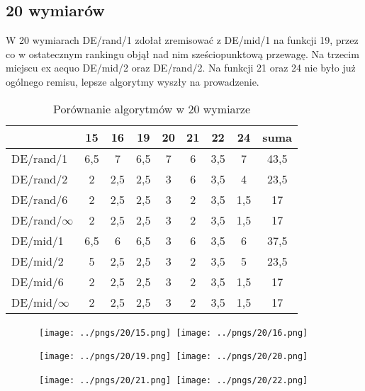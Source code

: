 \subsection{20 wymiarów}

W 20 wymiarach DE/rand/1 zdołał zremisować z DE/mid/1 na funkcji 19,
przez co w ostatecznym rankingu objął nad nim sześciopunktową przewagę.
Na trzecim miejscu ex aequo DE/mid/2 oraz DE/rand/2. Na funkcji 21 oraz 24 
nie było już ogólnego remisu, lepsze algorytmy wyszły na prowadzenie.

\begin{table}[H]
\centering
\begin{tabular}{ l | c | c | c | c | c | c | c | c}
                 & 15  & 16  & 19  & 20  & 21  & 22  & 24  & suma \\ \hline
DE/rand/1        & 6,5 & 7   & 6,5 & 7   & 6   & 3,5 & 7   & 43,5 \\ 
DE/rand/2        & 2   & 2,5 & 2,5 & 3   & 6   & 3,5 & 4   & 23,5 \\ 
DE/rand/6        & 2   & 2,5 & 2,5 & 3   & 2   & 3,5 & 1,5 & 17   \\ 
DE/rand/$\infty$ & 2   & 2,5 & 2,5 & 3   & 2   & 3,5 & 1,5 & 17   \\ 
DE/mid/1         & 6,5 & 6   & 6,5 & 3   & 6   & 3,5 & 6   & 37,5 \\
DE/mid/2         & 5   & 2,5 & 2,5 & 3   & 2   & 3,5 & 5   & 23,5 \\
DE/mid/6         & 2   & 2,5 & 2,5 & 3   & 2   & 3,5 & 1,5 & 17   \\ 
DE/mid/$\infty$  & 2   & 2,5 & 2,5 & 3   & 2   & 3,5 & 1,5 & 17   \\
\end{tabular}
\caption{Porównanie algorytmów w 20 wymiarze}
\label{table:20d}
\end{table}

\begin{figure}[H]
\centering
\mbox{
\texttt{[image: ../pngs/20/15.png]} \quad
\texttt{[image: ../pngs/20/16.png]} 
}
\end{figure}

\begin{figure}[H]
\centering
\mbox{
\texttt{[image: ../pngs/20/19.png]} \quad
\texttt{[image: ../pngs/20/20.png]} 
}
\end{figure}

\begin{figure}[H]
\centering
\mbox{
\texttt{[image: ../pngs/20/21.png]} \quad
\texttt{[image: ../pngs/20/22.png]} 
}
\end{figure}

